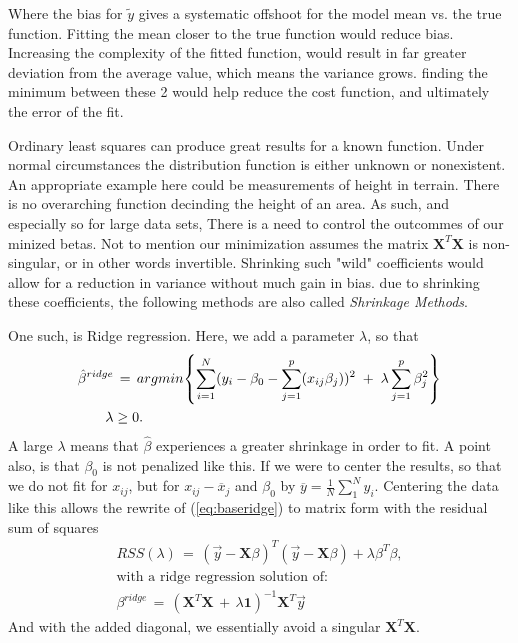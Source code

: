 \documentclass[ 12pt, a4paper ]{article}
\begin{document}
Where the bias for $\tilde{y}$ gives a systematic offshoot for the model mean vs. the true 
function. Fitting the mean closer to the true function would reduce bias. Increasing the 
complexity of the fitted function, would result in far greater deviation from the average
value, which means the variance grows. finding the minimum between these 2 would help reduce
the cost function, and ultimately the error of the fit. 

Ordinary least squares can produce great results for a known function. Under normal 
circumstances the distribution function is either unknown or nonexistent. An appropriate 
example here could be measurements of height in terrain. There is no overarching function 
decinding the height of an area. As such, and especially so for large data sets, There is a 
need to control the outcommes of our minized betas. Not to mention our minimization assumes 
the matrix $\mathbf{X}^T\mathbf{X}$ is non-singular, or in other words invertible. 
Shrinking such "wild" coefficients would allow for a reduction in variance without much gain
in bias. due to shrinking these coefficients, the following methods are also called 
\textit{Shrinkage Methods}. 

One such, is Ridge regression. Here, we add a parameter $\lambda$, so that 
\begin{align}
    \hat{\beta}^{ridge} &\,=\, 
    argmin\qty{ \sum_{i=1}^N (y_i - \beta_0 - \sum_{j=1}^p(x_{ij}\beta_j) )^2 
        \;+\; \lambda \sum_{j=1}^p \beta_j^2 }\label{eq:baseridge} \\
    \lambda &\geq 0. \nonumber
\end{align}
A large $\lambda$ means that $\hat{\beta}$ experiences a greater shrinkage in order to fit.
A point also, is that $\beta_0$ is not penalized like this. If we were to center the results, 
so that we do not fit for $x_{ij}$, but for $x_{ij} - \overline{x}_j$ and $\beta_0$ by 
$ \overline{y} = \frac{1}{N} \sum_1^N y_i$. %
Centering the data like this allows the rewrite of (\ref{eq:baseridge}) to matrix form
with the residual sum of squares
\begin{align}
    RSS(\lambda) \,=\, (\vec{y} - \mathbf{X}\beta)^T (\vec{y} - \mathbf{X}\beta)
        +   \lambda \beta^T\beta, \\
    \text{with a ridge regression solution of:}\nonumber \\
    \beta^{ridge} \,=\, (\mathbf{X}^T\mathbf{X} \,+\, \lambda \mathbf{1})^{-1}\mathbf{X}^T\vec{y}
    \label{eq:ridgesol}
\end{align}
And with the added diagonal, we essentially avoid a singular $\mathbf{X}^T\mathbf{X}$.\\
\end{document}
